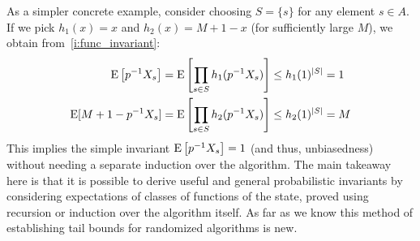 As a simpler concrete example, consider choosing $S = \{s\}$ for any element $s \in A$.
If we pick $h_1(x) = x$ and $h_2(x) = M+1-x$ (for sufficiently large $M$), we obtain from~\cref{i:func_invariant}:
\begin{align*}
\operatorname{\mathrm{E}} \left[ p^{-1} X_s \right] &= \operatorname{\mathrm{E}} \left[ \prod_{s \in S} h_1(p^{-1} X_s) \right] \leq h_1(1)^{|S|} = 1\\
\operatorname{\mathrm{E}} [M + 1 - p^{-1} X_s] &= \operatorname{\mathrm{E}} \left[ \prod_{s \in S} h_2(p^{-1} X_s) \right] \leq h_2(1)^{|S|} = M
\end{align*}
This implies the simple invariant $\operatorname{\mathrm{E}} \left[ p^{-1} X_s \right] = 1$ (and thus, unbiasedness) without needing a separate induction over the algorithm.
The main takeaway here is that it is possible to derive useful and general probabilistic invariants by considering expectations of classes of functions of the state, proved using recursion or induction over the algorithm itself.
As far as we know this method of establishing tail bounds for randomized algorithms is new.


